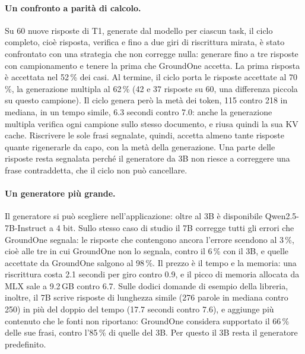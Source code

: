 \paragraph{Un confronto a parità di calcolo.} Su 60 nuove risposte di T1, generate dal modello per ciascun task, il ciclo
completo, cioè risposta, verifica e fino a due giri di riscrittura mirata, è stato confrontato con una strategia che non
corregge nulla: generare fino a tre risposte con campionamento e tenere la prima che GroundOne accetta. La prima risposta
è accettata nel 52\,\% dei casi. Al termine, il ciclo porta le risposte accettate al 70\,\%, la generazione multipla al 62\,\% (42 e 37 risposte su 60, una differenza piccola su questo campione). Il ciclo genera però la metà dei token, 115 contro 218 in mediana, in un tempo simile, 6.3 secondi contro 7.0: anche la generazione multipla verifica ogni campione sullo stesso documento, e riusa quindi la sua KV cache. Riscrivere le sole frasi segnalate, quindi, accetta almeno tante risposte quante rigenerarle da capo, con la metà della generazione. Una parte delle risposte resta segnalata perché il generatore da 3B non riesce a correggere
una frase contraddetta, che il ciclo non può cancellare.

\paragraph{Un generatore più grande.} Il generatore si può scegliere nell'applicazione: oltre al 3B è disponibile
Qwen2.5-7B-Instruct a 4 bit. Sullo stesso caso di studio il 7B corregge tutti gli errori che GroundOne segnala: le
risposte che contengono ancora l'errore scendono al 3\,\%, cioè alle tre in cui GroundOne non lo segnala, contro il
6\,\% con il 3B, e quelle accettate da GroundOne salgono al 98\,\%. Il prezzo è il tempo e la memoria: una riscrittura
costa 2.1 secondi per giro contro 0.9, e il picco di memoria allocata da MLX sale a 9.2\,GB contro 6.7. Sulle dodici
domande di esempio della libreria, inoltre, il 7B scrive risposte di lunghezza simile (276 parole in mediana contro
250) in più del doppio del tempo (17.7 secondi contro 7.6), e aggiunge più contenuto che le fonti non riportano:
GroundOne considera supportato il 66\,\% delle sue frasi, contro l'85\,\% di quelle del 3B. Per questo il 3B resta il
generatore predefinito.

